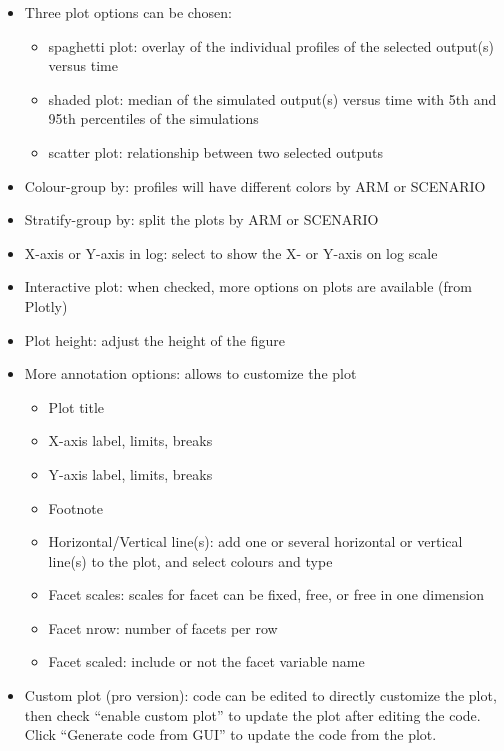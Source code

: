 \documentclass[
]{book}
\providecommand{\tightlist}{%
  \setlength{\itemsep}{0pt}\setlength{\parskip}{0pt}}
\begin{document}
\begin{itemize}
\item
  Three plot options can be chosen:

  \begin{itemize}
  \tightlist
  \item
    spaghetti plot: overlay of the individual profiles of the selected output(s) versus time
  \item
    shaded plot: median of the simulated output(s) versus time with 5th and 95th percentiles of the simulations
  \item
    scatter plot: relationship between two selected outputs
  \end{itemize}
\item
  Colour-group by: profiles will have different colors by ARM or SCENARIO
\item
  Stratify-group by: split the plots by ARM or SCENARIO
\item
  X-axis or Y-axis in log: select to show the X- or Y-axis on log scale
\item
  Interactive plot: when checked, more options on plots are available (from Plotly)
\item
  Plot height: adjust the height of the figure
\item
  More annotation options: allows to customize the plot

  \begin{itemize}
  \tightlist
  \item
    Plot title
  \item
    X-axis label, limits, breaks
  \item
    Y-axis label, limits, breaks
  \item
    Footnote
  \item
    Horizontal/Vertical line(s): add one or several horizontal or vertical line(s) to the plot, and select colours and type
  \item
    Facet scales: scales for facet can be fixed, free, or free in one dimension
  \item
    Facet nrow: number of facets per row
  \item
    Facet scaled: include or not the facet variable name
  \end{itemize}
\item
  Custom plot (pro version): code can be edited to directly customize the plot, then check ``enable custom plot'' to update the plot after editing the code. Click ``Generate code from GUI'' to update the code from the plot.
\end{itemize}
\end{document}
